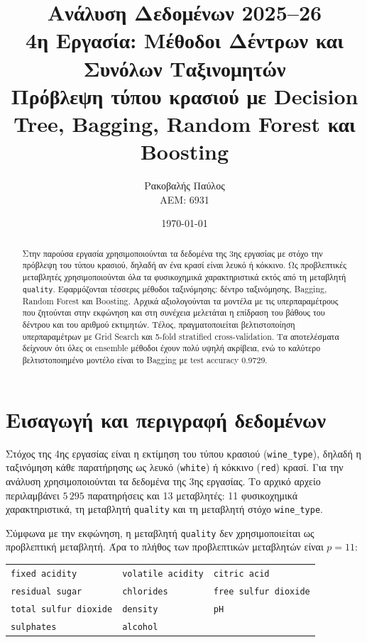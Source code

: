 \documentclass[12pt,a4paper]{article}
\title{
    \textbf{Ανάλυση Δεδομένων 2025--26}\\[0.25cm]
    \Large 4η Εργασία: Μέθοδοι Δέντρων και Συνόλων Ταξινομητών\\[0.15cm]
    \large Πρόβλεψη τύπου κρασιού με Decision Tree, Bagging, Random Forest και Boosting
}
\author{
    Ρακοβαλής Παύλος\\
    ΑΕΜ: 6931
}
\date{\today}
\newcommand{\code}[1]{\texttt{\textenglish{#1}}}
\begin{document}
\maketitle
\thispagestyle{fancy}

\begin{abstract}
Στην παρούσα εργασία χρησιμοποιούνται τα δεδομένα της 3ης εργασίας με στόχο
την πρόβλεψη του τύπου κρασιού, δηλαδή αν ένα κρασί είναι λευκό ή κόκκινο.
Ως προβλεπτικές μεταβλητές χρησιμοποιούνται όλα τα φυσικοχημικά
χαρακτηριστικά εκτός από τη μεταβλητή \code{quality}. Εφαρμόζονται τέσσερις
μέθοδοι ταξινόμησης: δέντρο ταξινόμησης, Bagging, Random Forest και Boosting.
Αρχικά αξιολογούνται τα μοντέλα με τις υπερπαραμέτρους που ζητούνται στην
εκφώνηση και στη συνέχεια μελετάται η επίδραση του βάθους του δέντρου και του
αριθμού εκτιμητών. Τέλος, πραγματοποιείται βελτιστοποίηση υπερπαραμέτρων με
Grid Search και 5-fold stratified cross-validation. Τα αποτελέσματα δείχνουν
ότι όλες οι ensemble μέθοδοι έχουν πολύ υψηλή ακρίβεια, ενώ το καλύτερο
βελτιστοποιημένο μοντέλο είναι το Bagging με test accuracy 0.9729.
\end{abstract}

\tableofcontents
\newpage

\section{Εισαγωγή και περιγραφή δεδομένων}

Στόχος της 4ης εργασίας είναι η εκτίμηση του τύπου κρασιού
(\code{wine\_type}), δηλαδή η ταξινόμηση κάθε παρατήρησης ως λευκό
(\code{white}) ή κόκκινο (\code{red}) κρασί. Για την ανάλυση χρησιμοποιούνται
τα δεδομένα της 3ης εργασίας. Το αρχικό αρχείο περιλαμβάνει $5\,295$
παρατηρήσεις και 13 μεταβλητές: 11 φυσικοχημικά χαρακτηριστικά, τη μεταβλητή
\code{quality} και τη μεταβλητή στόχο \code{wine\_type}.

Σύμφωνα με την εκφώνηση, η μεταβλητή \code{quality} δεν χρησιμοποιείται ως
προβλεπτική μεταβλητή. Άρα το πλήθος των προβλεπτικών μεταβλητών είναι
$p=11$:

\begin{center}
\footnotesize
\begin{tabular}{lll}
\toprule
\code{fixed acidity} & \code{volatile acidity} & \code{citric acid} \\
\code{residual sugar} & \code{chlorides} & \code{free sulfur dioxide} \\
\code{total sulfur dioxide} & \code{density} & \code{pH} \\
\code{sulphates} & \code{alcohol} & \\
\bottomrule
\end{tabular}
\end{center}
\end{document}
